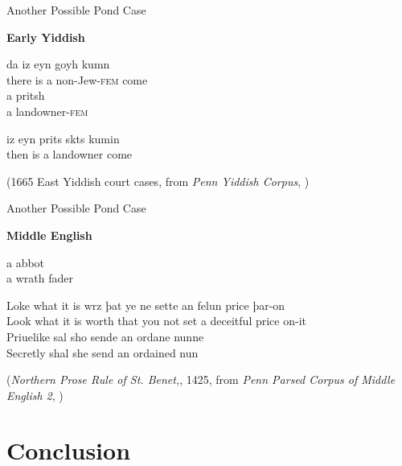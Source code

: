 \documentclass[hyperref={pdfpagelabels=false}]{beamer}
\begin{document}
\begin{frame}{Another Possible Pond Case}
 
 \begin{exe}

 	\ex \textbf{Early Yiddish}
 	\begin{xlist} 
 		\ex \gll da iz eyn goyh kumn\\
 		there is a non-Jew-\textsc{fem} come\\
 		\ex  \gll a pritsh\\
 		a landowner-\textsc{fem}\\
 	\end{xlist}
 	\ex \begin{xlist}
 		 \ex {} iz eyn {prits skts} kumin\\
 		 then is a landowner come\\
 		\end{xlist}
 	(1665 East Yiddish court cases, from \textsl{Penn Yiddish Corpus}, \citealt{santorini2008})
 \end{exe}  

   
  
  
\end{frame}

\begin{frame}{Another Possible Pond Case}

\begin{exe}
	\ex \textbf{Middle English}
	\begin{xlist} 
		\ex  a abbot\\
		\ex  a wrath fader\\
	\end{xlist}
	\ex \begin{xlist} 
		\ex \gll Loke what it is wrz þat ye ne sette an felun price þar-on\\
		Look what it is worth that you not set a deceitful price on-it\\
		\ex \gll Priuelike sal sho sende an ordane nunne\\
		Secretly shal she send an ordained nun\\
	\end{xlist}
	(\textsl{Northern Prose Rule of St. Benet,}, 1425, from  \textsl{Penn Parsed Corpus of Middle English 2}, \citealt{ppcme2})
\end{exe}  




\end{frame}




\section{Conclusion}
\end{document}
